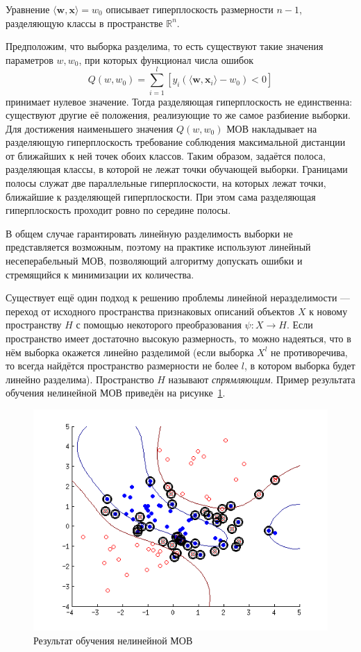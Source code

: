 Уравнение $ \langle \boldsymbol{w}, \boldsymbol{x} \rangle = w_0 $ описывает гиперплоскость размерности $ n - 1 $, разделяющую классы в пространстве $ \mathbb{R}^n $.

Предположим, что выборка разделима, то есть существуют такие значения параметров $ w, w_0 $, при которых функционал числа ошибок
\begin{equation*}
Q(w, w_0) = \sum_{i = 1}^l [y_i(\langle \boldsymbol{w}, \boldsymbol{x}_i \rangle - w_0) < 0]
\end{equation*}
принимает нулевое значение. Тогда разделяющая гиперплоскость не единственна: существуют другие её положения, реализующие то же самое разбиение выборки. Для достижения наименьшего значения $ Q(w, w_0) $ МОВ накладывает на разделяющую гиперплоскость требование соблюдения максимальной дистанции от ближайших к ней точек обоих классов. Таким образом, задаётся полоса, разделяющая классы, в которой не лежат точки обучающей выборки. Границами полосы служат две параллельные гиперплоскости, на которых лежат точки, ближайшие к разделяющей гиперплоскости. При этом сама разделяющая гиперплоскость проходит ровно по середине полосы.

В общем случае гарантировать линейную разделимость выборки не представляется возможным, поэтому на практике используют линейный несеперабельный МОВ, позволяющий алгоритму допускать ошибки и стремящийся к минимизации их количества.

Существует ещё один подход к решению проблемы линейной неразделимости --- переход от исходного пространства признаковых описаний объектов $ X $ к новому пространству $ H $ с помощью некоторого преобразования $ \psi: X \to H $. Если пространство имеет достаточно высокую размерность, то можно надеяться, что в нём выборка окажется линейно разделимой (если выборка $ X^l $ не противоречива, то всегда найдётся пространство размерности не более $ l $, в котором выборка будет линейно разделима). Пространство $ H $ называют \textit{спрямляющим}. Пример результата обучения нелинейной МОВ приведён на рисунке~\ref{fig:NonLinSVM}.

\begin{figure}[h]
     \centering
     \includegraphics[width=1\textwidth]{include/graphics/nonlin_svm}
     \caption{Результат обучения нелинейной МОВ}
     \label{fig:NonLinSVM}
\end{figure}

